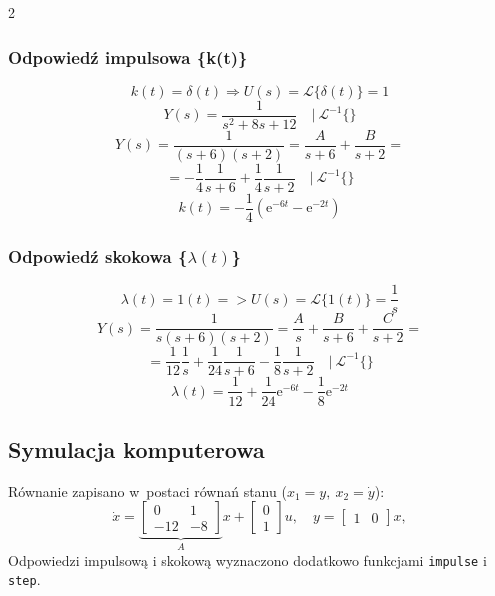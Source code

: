 \documentclass[12pt,a4paper]{article}
\begin{document}
\begin{multicols*}{2}
\subsubsection*{Odpowiedź impulsowa \{k(t)\}}
\begin{equation*}
    k(t) = \delta (t) \Rightarrow U(s) = \mathcal{L}\{\delta(t)\}=1
\end{equation*}
\begin{equation*}
    Y(s) = \frac{1}{s^2 + 8s +12}  \quad \Bigg| \ \mathcal{L}^{-1}\{\}
\end{equation*}
\begin{equation*}
    Y(s) = \frac{1}{(s+6)(s+2)} = \frac{A}{s+6} + \frac{B}{s+2} =
\end{equation*}
\begin{equation*}
    = -\frac{1}{4}\frac{1}{s+6} + \frac{1}{4}\frac{1}{s+2} \quad \Bigg| \ \mathcal{L}^{-1}\{\} 
\end{equation*}
\begin{equation}
    k(t) = -\frac{1}{4}(\mathrm{e}^{-6t} - \mathrm{e}^{-2t})
\end{equation}
\subsubsection*{Odpowiedź skokowa \{$\lambda(t)$\}}
\begin{equation*}
    \lambda(t) = 1(t) => U(s) = \mathcal{L}\{1(t)\} = \frac{1}{s}
\end{equation*}
\begin{equation*}
    Y(s) = \frac{1}{s(s+6)(s+2)} = \frac{A}{s} + \frac{B}{s+6} + \frac{C}{s+2}=
\end{equation*}
\begin{equation*}
   = \frac{1}{12}\frac{1}{s} + \frac{1}{24}\frac{1}{s+6} - \frac{1}{8}\frac{1}{s+2}  \quad \Bigg| \ \mathcal{L}^{-1}\{\}
\end{equation*}
\begin{equation}
    \lambda(t) = \frac{1}{12} + \frac{1}{24}\mathrm{e}^{-6t} -\frac{1}{8}\mathrm{e}^{-2t}
\end{equation}

\subsection{Symulacja komputerowa}
Równanie zapisano w~postaci równań stanu ($x_1=y,\ x_2=\dot y$):
\begin{equation}
    \dot{x} = \underbrace{\begin{bmatrix} 0 & 1 \\ -12 & -8 \end{bmatrix}}_{A}x
            + \begin{bmatrix} 0 \\ 1 \end{bmatrix}u, \quad
    y = \begin{bmatrix} 1 & 0 \end{bmatrix}x,
	\end{equation}
Odpowiedzi impulsową i skokową wyznaczono dodatkowo funkcjami \texttt{impulse}
i \texttt{step}.


\end{multicols*}
\end{document}
